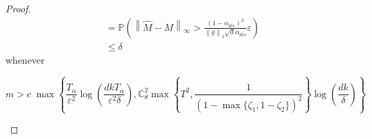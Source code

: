 \documentclass[opre,sglanonrev]{informs4}
\numberwithin{equation}{section}
\newcommand{\pow}[1]{^{(#1)}}
\newcommand{\lp}{\left(}
\newcommand{\rp}{\right)}
\newcommand{\lc}{\left\{}
\newcommand{\rc}{\right\}}
\newcommand{\lV}{\left\|}
\newcommand{\rV}{\right\|}
\newcommand{\Cbb}{\mathbb{C}}
\newcommand{\Pbb}{\mathbb{P}}
\newcommand{\constant}{\Cbb}
\newcommand{\prob}{\Pbb}
\newcommand{\eps}{\varepsilon}
\renewcommand{\epsilon}{\eps}
\begin{document}
\begin{APPENDICES}
\begin{proof}
\begin{align*}
    &  = \prob \lp \lV  \hat M - M \rV_{\infty}>\frac{(1-\alpha_{dis})^2}{\lV g\rV_{1}\sqrt{d}\alpha_{dis}}\eps \rp\\ 
    & \leq \delta
\end{align*}
whenever 
\begin{small}
\[ 
m>c \; \max\left\{\frac{T_\alpha}{\eps^2}\log\lp\frac{dkT_\alpha}{\epsilon^2\delta} \rp, \constant_\theta^2\max\lc {T}^2, \frac{1}{\lp 1-\max\{\zeta_1,1-\zeta_2\}\rp^2}\rc \log\lp \frac{dk}{\delta} \rp\right\}
\]
\end{small}
\end{proof}




\end{APPENDICES}
\end{document}
